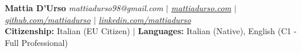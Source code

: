 \documentclass[10pt, a4paper, romans]{article}
\begin{document}
\begin{center}
\Huge 
\noindent   \textbf{Mattia D'Urso}
\break \hfill
\small \emph{mattiadurso98@gmail.com $|$ \href{https://mattiadurso.com}{mattiadurso.com} $|$ \href{https://github.com/mattiadurso}{github.com/mattiadurso} $|$ \href{https://www.linkedin.com/in/mattiadurso/}{linkedin.com/mattiadurso}} \\
\textbf{Citizenship:} Italian (EU Citizen) $|$ \textbf{Languages:} Italian (Native), English (C1 - Full Professional) \\
\par
\end{center}


\end{document}
